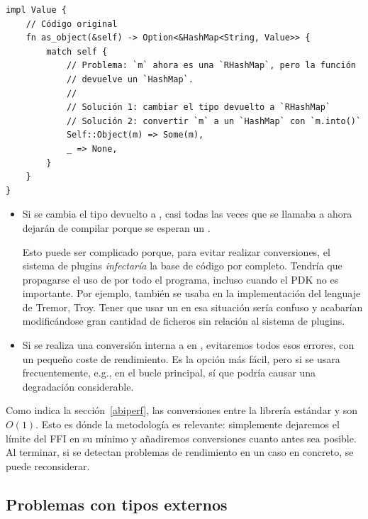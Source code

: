 \begin{verbatim}
impl Value {
    // Código original
    fn as_object(&self) -> Option<&HashMap<String, Value>> {
        match self {
            // Problema: `m` ahora es una `RHashMap`, pero la función
            // devuelve un `HashMap`.
            //
            // Solución 1: cambiar el tipo devuelto a `RHashMap`
            // Solución 2: convertir `m` a un `HashMap` con `m.into()`
            Self::Object(m) => Some(m),
            _ => None,
        }
    }
}
\end{verbatim}

\begin{itemize}
    \item Si se cambia el tipo devuelto a , casi todas las veces
        que se llamaba a  ahora dejarán de compilar porque se
        esperan un .

        Esto puede ser complicado porque, para evitar realizar conversiones, el
        sistema de plugins \emph{infectaría} la base de código por completo.
        Tendría que propagarse el uso de  por todo el programa,
        incluso cuando el PDK no es importante. Por ejemplo, 
        también se usaba en la implementación del lenguaje de Tremor, Troy.
        Tener que usar un  en esa situación sería confuso y
        acabarían modificándose gran cantidad de ficheros sin relación al
        sistema de plugins.

    \item Si se realiza una conversión interna a  en
        , evitaremos todos esos errores, con un pequeño coste de
        rendimiento. Es la opción más fácil, pero si  se
        usara frecuentemente, e.g., en el bucle principal, sí que podría causar
        una degradación considerable.
\end{itemize}

Como indica la sección~\ref{abiperf}, las conversiones entre la librería
estándar y \abistable son $O(1)$. Esto es dónde la metodología \work es
relevante: simplemente dejaremos el límite del FFI en su mínimo y añadiremos
conversiones cuanto antes sea posible. Al terminar, si se detectan problemas de
rendimiento en un caso en concreto, se puede reconsiderar.

\subsection{Problemas con tipos externos}

